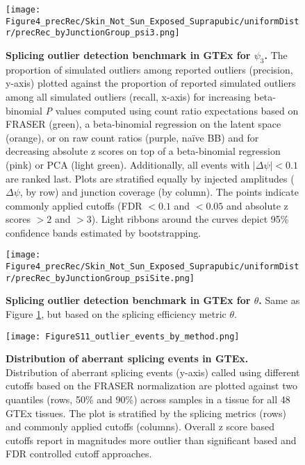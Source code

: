 \documentclass[a4paper,12pt]{article}
\begin{document}
\begin{figure}[h]
	\centering
	\texttt{[image: Figure4\_precRec/Skin\_Not\_Sun\_Exposed\_Suprapubic/uniformDistr/precRec\_byJunctionGroup\_psi3.png]}
	\caption{
	    \textbf{Splicing outlier detection benchmark in GTEx for $\psi_3$.}
	    The proportion of simulated outliers among reported outliers 
(precision, y-axis) plotted against the proportion of reported simulated 
outliers among all simulated outliers (recall, x-axis) for 
increasing beta-binomial \textit{P} values computed using count ratio 
expectations based on FRASER (green), a beta-binomial regression on the 
latent space (orange), or on raw count ratios (purple, na\"ive BB) 
and for decreasing absolute z scores on top of a beta-binomial regression
(pink) or PCA (light green). Additionally, all events with $|\Delta\psi| < 0.1$ are ranked last.
Plots are stratified equally by injected amplitudes ($\Delta\psi$, by row) 
and junction coverage (by column). The points indicate commonly 
applied cutoffs (FDR $< 0.1$ and $< 0.05$ and absolute z scores $>2$ and $>3$). 
Light ribbons around the curves depict 95\% confidence bands estimated by bootstrapping.
}
\label{fig:Bench3}
\end{figure}
\pagebreak


\begin{figure}[h]
	\centering
	\texttt{[image: Figure4\_precRec/Skin\_Not\_Sun\_Exposed\_Suprapubic/uniformDistr/precRec\_byJunctionGroup\_psiSite.png]}
	\caption{
	    \textbf{Splicing outlier detection benchmark in GTEx for $\theta$.}
	    Same as Figure \ref{fig:Bench3}, but based on the splicing efficiency metric $\theta$.
}
\end{figure}
\pagebreak


\begin{figure}[h]
\centering
	\texttt{[image: FigureS11\_outlier\_events\_by\_method.png]}
	\caption{
	    \textbf{Distribution of aberrant splicing events in GTEx.}
	    Distribution of aberrant splicing events (y-axis) called using different 
	    cutoffs based on the FRASER normalization are plotted against
	    two quantiles (rows, 50\% and 90\%) across samples in a tissue for all 
	    48 GTEx tissues. The plot is stratified by the splicing metrics (rows) and 
	    commonly applied cutoffs (columns). Overall z score based cutoffs report 
	    in magnitudes more outlier than significant based and FDR controlled 
	    cutoff approaches.
}
\end{figure}
\pagebreak
\end{document}
